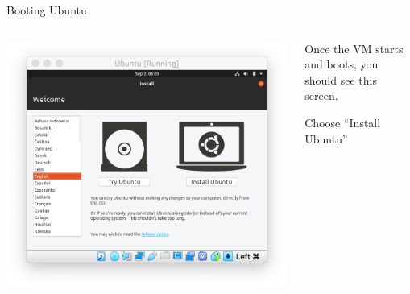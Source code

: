 \documentclass[12pt]{beamer}
\begin{document}
\begin{frame}{Booting Ubuntu}
  \begin{columns}
    \begin{column}{0.65\linewidth}
      \includegraphics[width=\linewidth]{ubuntu}
    \end{column}
    \begin{column}{0.35\linewidth}
      Once the VM starts and boots, you should see this screen.

      Choose ``Install Ubuntu''
    \end{column}
  \end{columns}
\end{frame}
\end{document}
